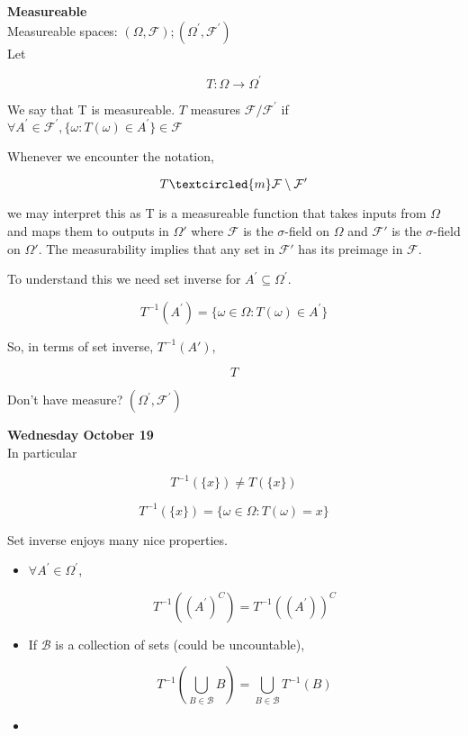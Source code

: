 \documentclass[11pt,fleqn]{book} %
\begin{document}
\textbf{Measureable}\\


Measureable spaces: $(\Omega, \mathcal{F}); (\Omega^\prime, \mathcal{F}^\prime)$\\

Let

		$$T : \Omega \rightarrow \Omega^\prime $$

We say that T is measureable. $T$ measures $\mathcal{F}/\mathcal{F}^\prime$ if $\forall A^\prime \in \mathcal{F}^\prime, \{\omega: T(\omega) \in A^\prime\} \in \mathcal{F}$\\


\begin{notation}
	Whenever we encounter the notation, 	

			$$ T \textcircled{m} \mathcal{F}\setminus\mathcal{F}^\prime$$

	we may interpret this as T is a measureable function that takes inputs from $\Omega$ and maps them to outputs in $\Omega'$ where $\mathcal{F}$ is the $\sigma$-field on $\Omega$ and $\mathcal{F}'$ is the $\sigma$-field on $\Omega'$. The measurability implies that any set in $\mathcal{F}'$ has its preimage in $\mathcal{F}$.
\end{notation}


To understand this we need set inverse for $A^\prime \subseteq \Omega^\prime$. 

		$$T^{-1}( A^\prime) = \{ \omega \in \Omega: T(\omega) \in A^\prime\} $$ 

So, in terms of set inverse, $T^{-1}(A\prime)$, 

		$$T  $$




Don't have measure? $(\Omega^\prime, \mathcal{F}^\prime)$


\textbf{Wednesday October 19}\\


In particular 

		$$T^{-1}(\{x\}) \neq  T(\{x\}) $$

		$$T^{-1}(\{x\}) = \{ \omega \in \Omega: T(\omega) = x\} $$


Set inverse enjoys many nice properties. 

\begin{itemize}
			\item $\forall A^\prime \in \Omega^\prime$, 

					$$T^{-1}((A^\prime)^C) =  T^{-1}((A^\prime))^C $$

			\item If $\mathcal{B}$ is a collection of sets (could be uncountable), 

					$$T^{-1}(\bigcup_{B \in \mathcal{B}} B ) = \bigcup_{B \in \mathcal{B}} T^{-1}(B) $$
			\item 
		\end{itemize}		
\end{document}
